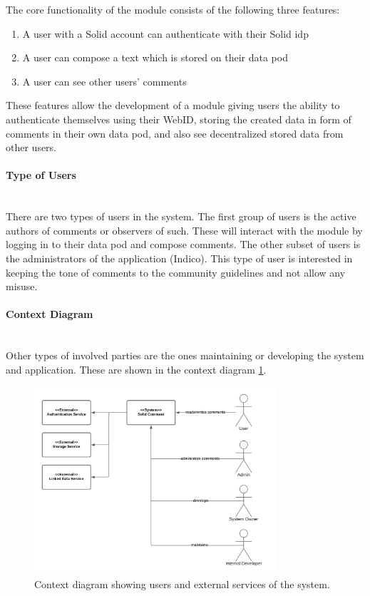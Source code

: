 The core functionality of the module consists of the following three features: 
\vspace{-3mm}
\begin{enumerate}
    \item A user with a Solid account can authenticate with their Solid \gls{idp}
    \item A user can compose a text which is stored on their data pod
    \item A user can see other users’ comments
\end{enumerate}
\vspace{-3mm}

These features allow the development of a module giving users the ability to authenticate themselves using their WebID, storing the created data in form of comments in their own data pod, and also see decentralized stored data from other users.
\vspace{0.5cm}
\paragraph{Type of Users}\mbox{}\\

There are two types of users in the system. The first group of users is the active authors of comments or observers of such. These will interact with the module by logging in to their data pod and compose comments. The other subset of users is the administrators of the application (Indico). This type of user is interested in keeping the tone of comments to the community guidelines and not allow any misuse.
\vspace{0.5cm}
\paragraph{Context Diagram}\mbox{}\\

Other types of involved parties are the ones maintaining or developing the system and application. These are shown in the context diagram \ref{fig:poc-comment-context_diagram}.

\begin{figure}[H]
    \centering
    \includegraphics[width=0.8\textwidth]{prototype/graphs/poc-comment-context_diagram.png}
    \caption{Context diagram showing users and external services of the system.}
    \label{fig:poc-comment-context_diagram}
\end{figure}
\vspace{0.5cm}
